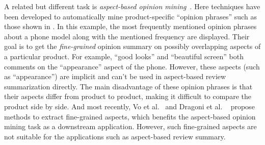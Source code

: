 A related but different task is \textit{aspect-based opinion 
mining}~\cite{su2008hidden,zeng2013classification,manek2017aspect}.
Here techniques have been developed to automatically mine
product-specific ``opinion phrases'' such as those shown in 
.
In this example, the most frequently mentioned opinion phrases
about a phone model along with the mentioned frequency
are displayed. 
Their goal is to get the {\em fine-grained} opinion summary on
possibly overlapping aspects of a particular product.
For example, ``good looks'' and ``beautiful screen'' both comments
on the ``appearance'' aspect of the phone. However, these aspects (such
as ``appearance'')
are implicit and can't be used in aspect-based review summarization
directly. 
The main disadvantage of these opinion phrases is that
their aspects differ from product to product, making it difficult to compare the product side by side. 
And most recently, Vo et al.~\cite{vo2018automatic} and Dragoni et al. ~\cite{dragoni2018unsupervised} 
propose methods to extract fine-grained aspects, which benefits 
the aspect-based opinion mining task as a downstream application.
However, such fine-grained aspects are not 
suitable for the applications such as aspect-based review summary.

